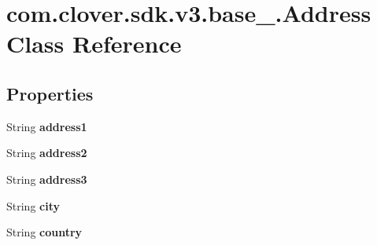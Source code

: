 \hypertarget{classcom_1_1clover_1_1sdk_1_1v3_1_1base___1_1_address}{}\section{com.\+clover.\+sdk.\+v3.\+base\+\_\+.\+Address Class Reference}
\label{classcom_1_1clover_1_1sdk_1_1v3_1_1base___1_1_address}
\subsection*{Properties}
\begin{DoxyCompactItemize}
\item 
\mbox{\label{classcom_1_1clover_1_1sdk_1_1v3_1_1base___1_1_address_a497b7c55ff38db65464744f197220fc1}} 
String {\bfseries address1}
\item 
\mbox{\label{classcom_1_1clover_1_1sdk_1_1v3_1_1base___1_1_address_aa1f8a5d5d5939ef3306ab9d7f3ef3484}} 
String {\bfseries address2}
\item 
\mbox{\label{classcom_1_1clover_1_1sdk_1_1v3_1_1base___1_1_address_aa904055629ff84a30ca09e1365cb81d7}} 
String {\bfseries address3}
\item 
\mbox{\label{classcom_1_1clover_1_1sdk_1_1v3_1_1base___1_1_address_a19f76bc784d6af732735688b1b6d25a1}} 
String {\bfseries city}
\item 
\mbox{\label{classcom_1_1clover_1_1sdk_1_1v3_1_1base___1_1_address_a6853ff5136eb1094dbbc7e15d74ae069}} 
String {\bfseries country}
\item 

\end{DoxyCompactItemize}
